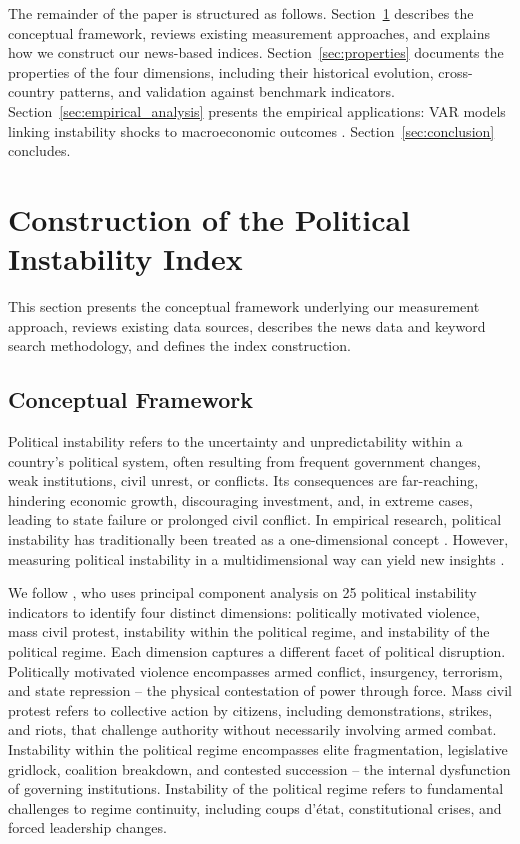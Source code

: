 \documentclass[12pt,a4paper,fleqn]{article}
\begin{document}
The remainder of the paper is structured as follows. Section~\ref{sec:construction} describes the conceptual framework, reviews existing measurement approaches, and explains how we construct our news-based indices. Section~\ref{sec:properties} documents the properties of the four dimensions, including their historical evolution, cross-country patterns, and validation against benchmark indicators. Section~\ref{sec:empirical_analysis} presents the empirical applications: VAR models linking instability shocks to macroeconomic outcomes%
. Section~\ref{sec:conclusion} concludes.


\section{Construction of the Political Instability Index}\label{sec:construction}

This section presents the conceptual framework underlying our measurement approach, reviews existing data sources, describes the news data and keyword search methodology, and defines the index construction.


\subsection{Conceptual Framework}\label{sec:concept}

Political instability refers to the uncertainty and unpredictability within a country's political system, often resulting from frequent government changes, weak institutions, civil unrest, or conflicts. Its consequences are far-reaching, hindering economic growth, discouraging investment, and, in extreme cases, leading to state failure or prolonged civil conflict. In empirical research, political instability has traditionally been treated as a one-dimensional concept \citep{Alesina1996}. However, measuring political instability in a multidimensional way can yield new insights \citep{Perotti1996, Rummel1966, Tanter1966, Feierabend1966, Morrison1971, hibbs1973mass}.

We follow \cite{JONGAPIN2009}, who uses principal component analysis on 25 political instability indicators to identify four distinct dimensions: politically motivated violence, mass civil protest, instability within the political regime, and instability of the political regime. Each dimension captures a different facet of political disruption. Politically motivated violence encompasses armed conflict, insurgency, terrorism, and state repression -- the physical contestation of power through force. Mass civil protest refers to collective action by citizens, including demonstrations, strikes, and riots, that challenge authority without necessarily involving armed combat. Instability within the political regime encompasses elite fragmentation, legislative gridlock, coalition breakdown, and contested succession -- the internal dysfunction of governing institutions. Instability of the political regime refers to fundamental challenges to regime continuity, including coups d'état, constitutional crises, and forced leadership changes.
\end{document}
